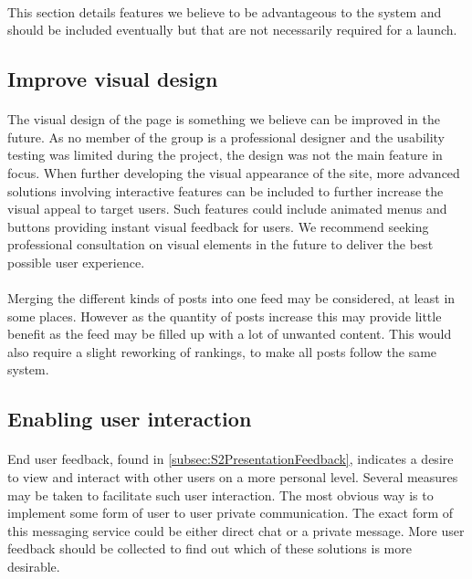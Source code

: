 \paragraph{} This section details features we believe to be advantageous to the system and should be included eventually but that are not necessarily required for a launch.

\subsection{Improve visual design}
\label{subsec:FurtherImprovementsVisDesign}

\paragraph{} The visual design of the page is something we believe can be improved in the future. As no member of the group is a professional designer and the usability testing was limited during the project, the design was not the main feature in focus. When further developing the visual appearance of the site, more advanced solutions involving interactive features can be included to further increase the visual appeal to target users. Such features could include animated menus and buttons providing instant visual feedback for users. We recommend seeking professional consultation on visual elements in the future to deliver the best possible user experience.
\paragraph{} Merging the different kinds of posts into one feed may be considered, at least in some places. However as the quantity of posts increase this may provide little benefit as the feed may be filled up with a lot of unwanted content. This would also require a slight reworking of rankings, to make all posts follow the same system.

\subsection{Enabling user interaction}
\label{subsec:FurtherImprovementsInteraction}

\paragraph{} End user feedback, found in \ref{subsec:S2PresentationFeedback}, indicates a desire to view and interact with other users on a more personal level. Several measures may be taken to facilitate such user interaction. The most obvious way is to implement some form of user to user private communication. The exact form of this messaging service could be either direct chat or a private message. More user feedback should be collected to find out which of these solutions is more desirable.
